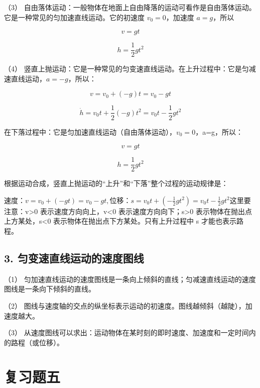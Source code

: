 （3）
自由落体运动：一般物体在地面上自由降落的运动可看作是自由落体运动。它是一种常见的匀加速直线运动。它的初速度
\(v_{0} = 0\)，加速度 \(a = g\)，所以

\[
v = g t
\]

\[
h = \frac {1}{2} g t ^ {2}
\]

（4）
竖直上抛运动：它是一种常见的匀变速直线运动。在上升过程中：它是匀减速直线运动，\(a = -g\)，所以：

\[
v = v _ {0} + (- g) t = v _ {0} - g t
\]

\[
\dot {h} = v _ {0} t + \frac {1}{2} (- g) t ^ {2} = v _ {0} t - \frac {1}{2} g t ^ {2}
\]

在下落过程中：它是匀加速直线运动（自由落体运动），\(v_{0}=0\)，a=g，所以：

\[
v = g t
\]

\[
h = \frac {1}{2} g t ^ {2}
\]

根据运动合成，竖直上抛运动的``上升''和``下落''整个过程的运动规律是：

速度：\(v=v_{0}+(-gt)=v_{0}-gt,\)位移：\(s = v_{0}t + \left(-\frac{1}{2} gt^{2}\right) = v_{0}t - \frac{1}{2} gt^{2}\)这里要注意：v\textgreater0
表示速度方向向上，v\textless0 表示速度方向向下；s\textgreater0
表示物体在抛出点上方某处，s\textless0
表示物体在抛出点下方某处。只有上升过程中 s 才能也表示路程。

\subsection{3.
匀变速直线运动的速度图线}\label{ux5300ux53d8ux901fux76f4ux7ebfux8fd0ux52a8ux7684ux901fux5ea6ux56feux7ebf}

（1）
匀加速直线运动的速度图线是一条向上倾斜的直线；匀减速直线运动的速度图线是一条向下倾斜的直线。

（2）
图线与速度轴的交点的纵坐标表示运动的初速度。图线越倾斜（越陡），加速度越大。

（3）
从速度图线可以求出：运动物体在某时刻的即时速度、加速度和一定时间内的路程（或位移）。

\section{复习题五}\label{ux590dux4e60ux9898ux4e94}

